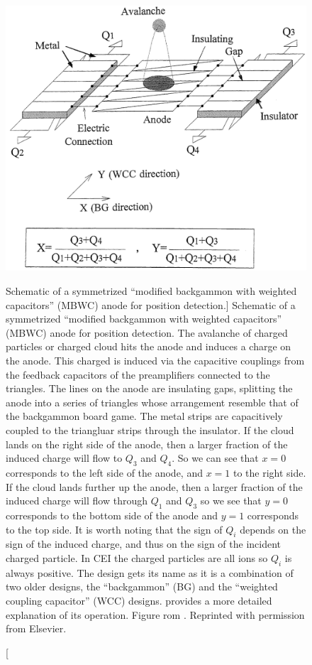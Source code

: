 \begin{figure}
  \centering
  \includegraphics[width=\textwidth]{gfx/MBWC}
  \caption
  [Schematic of a symmetrized ``modified backgammon with weighted capacitors'' (MBWC) anode for position detection.]
  {Schematic of a symmetrized ``modified backgammon with weighted capacitors'' (MBWC) anode for position detection. The avalanche of charged particles or charged cloud hits the anode and induces a charge on the anode. This charged is induced via the capacitive couplings from the feedback capacitors of the preamplifiers connected to the triangles. The lines on the anode are insulating gaps, splitting the anode into a series of triangles whose arrangement resemble that of the backgammon board game. The metal strips are capacitively coupled to the triangluar strips through the insulator. If the cloud lands on the right side of the anode, then a larger fraction of the induced charge will flow to $Q_3$ and $Q_4$. So we can see that $x=0$ corresponds to the left side of the anode, and $x=1$ to the right side. If the cloud lands further up the anode, then a larger fraction of the induced charge will flow through $Q_1$ and $Q_3$ so we see that $y=0$ corresponds to the bottom side of the anode and $y=1$ corresponds to the top side. It is worth noting that the sign of $Q_i$ depends on the sign of the induced charge, and thus on the sign of the incident charged particle. In CEI the charged particles are all ions so $Q_i$ is always positive. The design gets its name as it is a combination of two older designs, the ``backgammon'' (BG) and the ``weighted coupling capacitor'' (WCC) designs. \citet{Mizogawa92} provides a more detailed explanation of its operation.  Figure rom \citet{Mizogawa02}. Reprinted with permission from Elsevier.}
  \label{fig:MBWC}
\end{figure}

